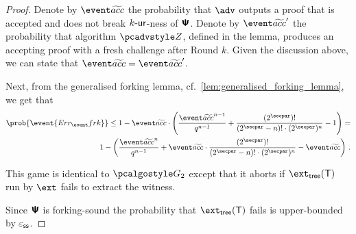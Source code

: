 \documentclass[runningheads,10pt]{llncs}
\begin{document}
\begin{proof}
Denote by $\waccProb$ the probability that $\advse$ outputs a proof that is
accepted and does not break ${k\text{-}\mathsf{ur}}$-ness of $\bm{\mathsf{\Psi}}$.  Denote by $\waccProb'$ the
probability that algorithm $\zdv$, defined in the lemma, produces an accepting
proof with a fresh challenge after Round $k$. Given the discussion above, we can
state that $\waccProb = \waccProb'$.

Next, from the generalised forking lemma, cf.~\cref{lem:generalised_forking_lemma}, we get that
\begin{equation}
  \begin{split}
    \prob{\event{\errfrk}} \leq 1 - \waccProb \cdot \left(\frac{\waccProb^{n -
          1}}{q^{n - 1}} + \frac{(2^\secpar) !}{(2^\secpar - n)! \cdot
        (2^\secpar)^{n}} - 1\right) = \\
    1 - \left(\frac{\waccProb^{n}}{q^{n - 1}} + 
      \waccProb \cdot \frac{(2^\secpar) !}{(2^\secpar - n)! \cdot
        (2^\secpar)^{n}} - \waccProb\right)\,.
\end{split}
\end{equation}



 This game is identical to $\game{2}$ except that it aborts if
$\extt(\tree)$ run by $\ext$ fails to extract the witness. 

Since $\bm{\mathsf{\Psi}}$ is forking-sound the probability that $\extt(\tree)$
fails is upper-bounded by $\varepsilon_{\mathsf{ss}}$. 


\end{proof}
\end{document}
